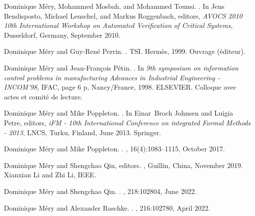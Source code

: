 \documentclass[ 12pt]{article}
\begin{document}
\begin{thebibliography}{100}
Dominique M{\'e}ry, Mohammed Mosbah, and Mohammed Tounsi.
.
\newblock In Jens Bendisposto, Michael Leuschel, and Markus Roggenbach,
  editors, {\em {AVOCS 2010 10th International Workshop on Automated
  Verification of Critical Systems}}, Dusseldorf, Germany, September 2010.

Dominique M{\'e}ry and Guy-Ren{\'e} Perrin.
.
\newblock TSI. {Herm{\`e}s}, 1999.
\newblock Ouvrage ({\'e}diteur).

Dominique M{\'e}ry and Jean-Fran{\c c}ois P{\'e}tin.
.
\newblock In {\em {9th symposium on information control problems in
  manufacturing Advances in Industrial Engineering - INCOM'98}}, IFAC, page 6
  p, Nancy/France, 1998. {ELSEVIER}.
\newblock Colloque avec actes et comit{\'e} de lecture.

Dominique M{\'e}ry and Mike Poppleton.
.
\newblock In Einar~Broch Johnsen and Luigia Petre, editors, {\em {iFM - 10th
  International Conference on integrated Formal Methods - 2013}}, LNCS, Turku,
  Finland, June 2013. {Springer}.

Dominique M{\'e}ry and Mike Poppleton.
.
, 16(4):1083--1115, October
  2017.

Dominique M{\'e}ry and Shengchao Qin, editors.
, Guillin, China, November 2019. {Xianxian Li and Zhi
  Li}, {IEEE}.

Dominique M{\'e}ry and Shengchao Qin.
.
, 218:102804, June 2022.

Dominique M{\'e}ry and Alexander Raschke.
.
, 216:102780, April 2022.


\end{thebibliography}
\end{document}
